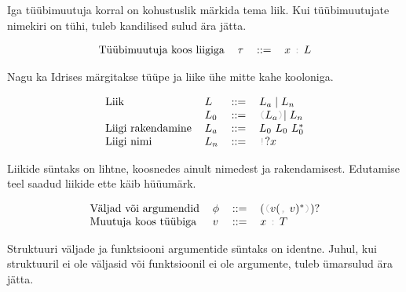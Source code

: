 \documentclass[12pt]{article}
\begin{document}
    Iga tüübimuutuja korral on kohustuslik märkida tema liik. Kui tüübimuutujate nimekiri on tühi, tuleb kandilised sulud ära jätta.

    \begin{equation*}
      \begin{tabular}{llll}
        Tüübimuutuja koos liigiga & $\tau$ & $::=$ & $x$ {\color{helehall}\verb!:!} $L$
      \end{tabular}
    \end{equation*}

    Nagu ka Idrises märgitakse tüüpe ja liike ühe mitte kahe kooloniga.

    \begin{equation*}
      \begin{tabular}{llll}
        Liik              & $L$   & $::=$ & $L_a\mid L_n$                                                       \\
                          & $L_0$ & $::=$ & {\color{helehall}\verb!(!}$L_a${\color{helehall}\verb!)!}$\mid L_n$ \\
        Liigi rakendamine & $L_a$ & $::=$ & $L_0$ $L_0$ $L_0^*$                                                       \\
        Liigi nimi        & $L_n$ & $::=$ & {\color{helehall}\verb"!"}$?x$
      \end{tabular}
    \end{equation*}

    Liikide süntaks on lihtne, koosnedes ainult nimedest ja rakendamisest. Edutamise teel saadud liikide ette käib hüüumärk.

    \begin{equation*}
      \begin{tabular}{llll}
        Väljad või argumendid & $\phi$ & $::=$ & $(${\color{helehall}\verb!(!}$v(${\color{helehall}\verb!,!} $v)^*${\color{helehall}\verb!)!}$)?$ \\
        Muutuja koos tüübiga  & $v$    & $::=$ & $x$ {\color{helehall}\verb!:!} $T$
      \end{tabular}
    \end{equation*}

    Struktuuri väljade ja funktsiooni argumentide süntaks on identne. Juhul, kui struktuuril ei ole väljasid või funktsioonil ei ole argumente, tuleb ümarsulud ära jätta.
\end{document}

